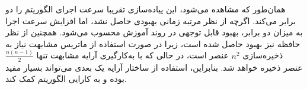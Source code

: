 همان‌طور که مشاهده می‌شود، این پیاده‌سازی تقریبا سرعت اجرای الگوریتم را دو برابر می‌کند. اگرچه از نظر مرتبه زمانی بهبودی حاصل نشد، اما افزایش سرعت اجرا به میزان دو برابر، بهبود قابل توجهی در روند آموزش محسوب می‌شود. همچنین از نظر حافظه نیز بهبود حاصل شده است، زیرا در صورت استفاده از ماتریس مشابهت نیاز به ذخیره‌سازی \(n^2\) عنصر است، در حالی که با به‌کارگیری آرایه مشابهت تنها \(\frac{n(n-1)}{2}\) عنصر ذخیره خواهد شد. بنابراین، استفاده از ساختار آرایه یک بعدی می‌تواند بسیار مفید بوده و به کارایی الگوریتم کمک کند.








